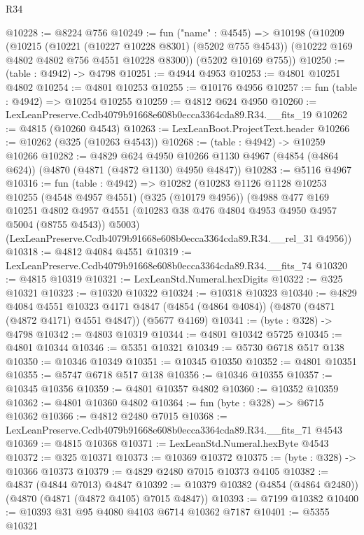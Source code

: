 \begin{lexlean}{R34}
\begin{coremodule}
@10228 := @8224 @756
@10249 := fun ("name" : @4545) =>
  @10198
    (@10209
      (@10215
        (@10221 (@10227 @10228 @8301) (@5202 @755 @4543))
        (@10222 @169 @4802 @4802 @756 @4551 @10228 @8300))
      (@5202 @10169 @755))
@10250 := (table : @4942) -> @4798
@10251 := @4944 @4953
@10253 := @4801 @10251 @4802
@10254 := @4801 @10253
@10255 := @10176 @4956
@10257 := fun (table : @4942) => @10254 @10255
@10259 := @4812 @624 @4950
@10260 := LexLeanPreserve.Ccdb4079b91668e608b0ecca3364cda89.R34.__fits_19
@10262 := @4815 (@10260 @4543)
@10263 := LexLeanBoot.ProjectText.header
@10266 := @10262 (@325 (@10263 @4543))
@10268 := (table : @4942) -> @10259 @10266
@10282 := @4829
    @624
    @4950
    @10266
    @1130
    @4967
    (@4854 (@4864 @624))
    (@4870 (@4871 (@4872 @1130) @4950 @4847))
@10283 := @5116 @4967
@10316 := fun (table : @4942) =>
  @10282
    (@10283
      @1126
      @1128
      @10253
      @10255
      (@4548 @4957 @4551)
      (@325 (@10179 @4956))
      (@4988
        @477
        @169
        @10251
        @4802
        @4957
        @4551
        (@10283 @38 @476 @4804 @4953 @4950 @4957 @5004 (@8755 @4543))
        @5003)
      (LexLeanPreserve.Ccdb4079b91668e608b0ecca3364cda89.R34.__rel_31 @4956))
@10318 := @4812 @4084 @4551
@10319 := LexLeanPreserve.Ccdb4079b91668e608b0ecca3364cda89.R34.__fits_74
@10320 := @4815 @10319
@10321 := LexLeanStd.Numeral.hexDigits
@10322 := @325 @10321
@10323 := @10320 @10322
@10324 := @10318 @10323
@10340 := @4829
    @4084
    @4551
    @10323
    @4171
    @4847
    (@4854 (@4864 @4084))
    (@4870 (@4871 (@4872 @4171) @4551 @4847))
    (@5677 @4169)
@10341 := (byte : @328) -> @4798
@10342 := @4803 @10319
@10344 := @4801 @10342 @5725
@10345 := @4801 @10344
@10346 := @5351 @10321
@10349 := @5730 @6718 @517 @138
@10350 := @10346 @10349
@10351 := @10345 @10350
@10352 := @4801 @10351
@10355 := @5747 @6718 @517 @138
@10356 := @10346 @10355
@10357 := @10345 @10356
@10359 := @4801 @10357 @4802
@10360 := @10352 @10359
@10362 := @4801 @10360 @4802
@10364 := fun (byte : @328) => @6715 @10362
@10366 := @4812 @2480 @7015
@10368 := LexLeanPreserve.Ccdb4079b91668e608b0ecca3364cda89.R34.__fits_71 @4543
@10369 := @4815 @10368
@10371 := LexLeanStd.Numeral.hexByte @4543
@10372 := @325 @10371
@10373 := @10369 @10372
@10375 := (byte : @328) -> @10366 @10373
@10379 := @4829 @2480 @7015 @10373 @4105
@10382 := @4837 (@4844 @7013) @4847
@10392 := @10379 @10382 (@4854 (@4864 @2480)) (@4870 (@4871 (@4872 @4105) @7015 @4847))
@10393 := @7199 @10382
@10400 := @10393 @31 @95 @4080 @4103 @6714 @10362 @7187
@10401 := @5355 @10321

\end{coremodule}
\end{lexlean}
